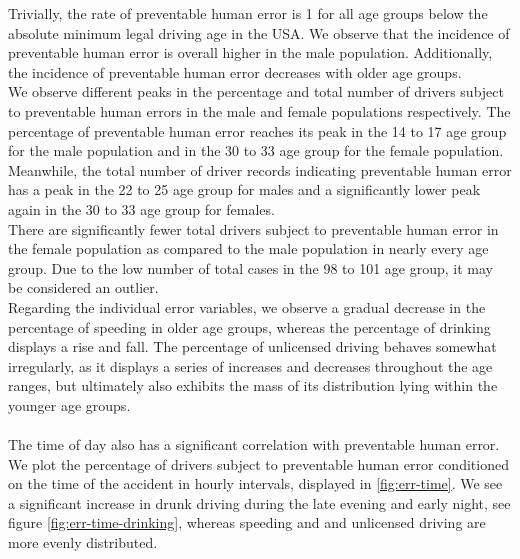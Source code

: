\documentclass{article}
\theoremstyle{plain}
\theoremstyle{definition}
\theoremstyle{remark}
\begin{document}
Trivially, the rate of preventable human error is 1 for all age groups below the absolute minimum legal driving age in the USA. We observe that the incidence of preventable human error is overall higher in the male population. Additionally, the incidence of preventable human error decreases with older age groups.
\\
We observe different peaks in the percentage and total number of drivers subject to preventable human errors in the male and female populations respectively. The percentage of preventable human error reaches its peak in the 14 to 17 age group for the male population and in the 30 to 33 age group for the female population. Meanwhile, the total number of driver records indicating preventable human error has a peak in the 22 to 25 age group for males and a significantly lower peak again in the 30 to 33 age group for females.\\
There are significantly fewer total drivers subject to preventable human error in the female population as compared to the male population in nearly every age group. Due to the low number of total cases in the 98 to 101 age group, it may be considered an outlier.\\
Regarding the individual error variables, we observe a gradual decrease in the percentage of speeding in older age groups, whereas the percentage of drinking displays a rise and fall. The percentage of unlicensed driving behaves somewhat irregularly, as it displays a series of increases and decreases throughout the age ranges, but ultimately also exhibits the mass of its distribution lying within the younger age groups.\\
\\
The time of day also has a significant correlation with preventable human error. We plot the percentage of drivers subject to preventable human error conditioned on the time of the accident in hourly intervals, displayed in \ref{fig:err-time}. We see a significant increase in drunk driving during the late evening and early night, see figure \ref{fig:err-time-drinking}, whereas speeding and and unlicensed driving are more evenly distributed.
\end{document}
